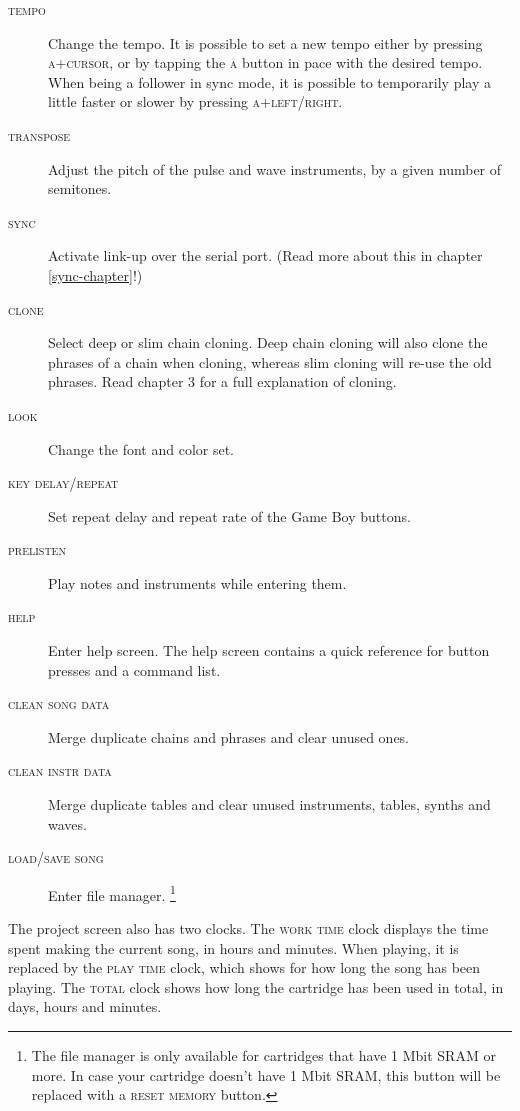 \begin{description}
	\item[\textsc{tempo}] Change the tempo. It is possible to set a new tempo either by pressing
\textsc{a+cursor}, or by tapping the \textsc{a} button in pace with the desired tempo. When being a
follower in sync mode, it is possible to temporarily play a little faster or slower by pressing \textsc{a+left/right}.
	\item[\textsc{transpose}] Adjust the pitch of the pulse and wave instruments, by a given number of semitones.
	\item[\textsc{sync}] Activate link-up over the serial port. (Read more about this in chapter \ref{sync-chapter}!)

	\item[\textsc{clone}] Select deep or slim chain cloning. Deep chain cloning will also clone the phrases of a chain when cloning, whereas slim cloning will re-use the old phrases. Read chapter 3 for a full explanation of cloning.
	\item[\textsc{look}] Change the font and color set.
	\item[\textsc{key delay/repeat}] Set repeat delay and repeat rate of the Game Boy buttons.
	\item[\textsc{prelisten}] Play notes and instruments while entering them.

	\item[\textsc{help}] Enter help screen. The help screen contains a quick reference for button presses and a command list.
	\item[\textsc{clean song data}] Merge duplicate chains and phrases and clear unused ones. \label{clean-song-data}
	\item[\textsc{clean instr data}] Merge duplicate tables and clear unused instruments, tables, synths and waves.
	\item[\textsc{load/save song}] Enter file manager. \footnote{The file manager is only available for cartridges that have 1 Mbit SRAM or more. In case your cartridge doesn't have 1 Mbit SRAM, this button will be replaced with a \textsc{reset memory} button.}
\end{description}

The project screen also has two clocks.
The \textsc{work time} clock displays the time spent making the current song, in hours and minutes.
When playing, it is replaced by the \textsc{play time} clock, which shows for how long the song has been playing.
The \textsc{total} clock shows how long the cartridge has been used in total, in days, hours and minutes.

